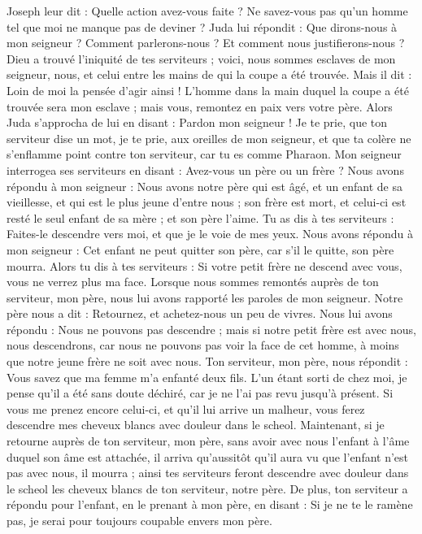 \begin{multicols}{2}
Joseph leur dit : Quelle action avez-vous faite ? Ne savez-vous pas qu'un homme tel que moi ne manque pas de deviner ?
Juda lui répondit : Que dirons-nous à mon seigneur ? Comment parlerons-nous ? Et comment nous justifierons-nous ? Dieu a trouvé l'iniquité de tes serviteurs ; voici, nous sommes esclaves de mon seigneur, nous, et celui entre les mains de qui la coupe a été trouvée.
Mais il dit : Loin de moi la pensée d'agir ainsi ! L'homme dans la main duquel la coupe a été trouvée sera mon esclave ; mais vous, remontez en paix vers votre père.
Alors Juda s'approcha de lui en disant : Pardon mon seigneur ! Je te prie, que ton serviteur dise un mot, je te prie, aux oreilles de mon seigneur, et que ta colère ne s'enflamme point contre ton serviteur, car tu es comme Pharaon.
Mon seigneur interrogea ses serviteurs en disant : Avez-vous un père ou un frère ?
Nous avons répondu à mon seigneur : Nous avons notre père qui est âgé, et un enfant de sa vieillesse, et qui est le plus jeune d'entre nous ; son frère est mort, et celui-ci est resté le seul enfant de sa mère ; et son père l'aime.
Tu as dis à tes serviteurs : Faites-le descendre vers moi, et que je le voie de mes yeux.
Nous avons répondu à mon seigneur : Cet enfant ne peut quitter son père, car s'il le quitte, son père mourra.
Alors tu dis à tes serviteurs : Si votre petit frère ne descend avec vous, vous ne verrez plus ma face.
Lorsque nous sommes remontés auprès de ton serviteur, mon père, nous lui avons rapporté les paroles de mon seigneur.
Notre père nous a dit : Retournez, et achetez-nous un peu de vivres.
Nous lui avons répondu : Nous ne pouvons pas descendre ; mais si notre petit frère est avec nous, nous descendrons, car nous ne pouvons pas voir la face de cet homme, à moins que notre jeune frère ne soit avec nous.
Ton serviteur, mon père, nous répondit : Vous savez que ma femme m'a enfanté deux fils.
L'un étant sorti de chez moi, je pense qu'il a été sans doute déchiré, car je ne l'ai pas revu jusqu'à présent.
Si vous me prenez encore celui-ci, et qu'il lui arrive un malheur, vous ferez descendre mes cheveux blancs avec douleur dans le scheol.
Maintenant, si je retourne auprès de ton serviteur, mon père, sans avoir avec nous l'enfant à l'âme duquel son âme est attachée,
il arriva qu'aussitôt qu'il aura vu que l'enfant n'est pas avec nous, il mourra ; ainsi tes serviteurs feront descendre avec douleur dans le scheol les cheveux blancs de ton serviteur, notre père.
De plus, ton serviteur a répondu pour l'enfant, en le prenant à mon père, en disant : Si je ne te le ramène pas, je serai pour toujours coupable envers mon père.

\end{multicols}
